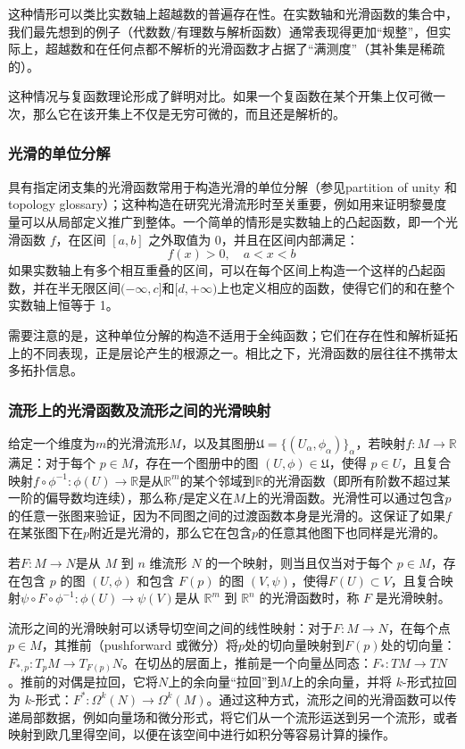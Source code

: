 这种情形可以类比实数轴上超越数的普遍存在性。在实数轴和光滑函数的集合中，我们最先想到的例子（代数数/有理数与解析函数）通常表现得更加“规整”，但实际上，超越数和在任何点都不解析的光滑函数才占据了“满测度”（其补集是稀疏的）。

这种情况与复函数理论形成了鲜明对比。如果一个复函数在某个开集上仅可微一次，那么它在该开集上不仅是无穷可微的，而且还是解析的。
\subsubsection{光滑的单位分解}
具有指定闭支集的光滑函数常用于构造光滑的单位分解（参见partition of unity 和topology glossary）；这种构造在研究光滑流形时至关重要，例如用来证明黎曼度量可以从局部定义推广到整体。一个简单的情形是实数轴上的凸起函数，即一个光滑函数 $f$，在区间 $[a,b]$ 之外取值为 0，并且在区间内部满足：
$$
f(x) > 0, \quad a < x < b~
$$
如果实数轴上有多个相互重叠的区间，可以在每个区间上构造一个这样的凸起函数，并在半无限区间$(-\infty, c]$和$[d, +\infty)$上也定义相应的函数，使得它们的和在整个实数轴上恒等于 1。

需要注意的是，这种单位分解的构造不适用于全纯函数；它们在存在性和解析延拓上的不同表现，正是层论产生的根源之一。相比之下，光滑函数的层往往不携带太多拓扑信息。
\subsubsection{流形上的光滑函数及流形之间的光滑映射}
给定一个维度为$m$的光滑流形$M$，以及其图册$\mathfrak{U} = \{(U_\alpha, \phi_\alpha)\}_\alpha$，若映射$f: M \to \mathbb{R}$满足：对于每个 $p \in M$，存在一个图册中的图 $(U, \phi) \in \mathfrak{U}$，使得 $p \in U$，且复合映射$f \circ \phi^{-1} : \phi(U) \to \mathbb{R}$是从$\mathbb{R}^m$的某个邻域到$\mathbb{R}$的光滑函数（即所有阶数不超过某一阶的偏导数均连续），那么称$f$是定义在$M$上的光滑函数。光滑性可以通过包含$p$的任意一张图来验证，因为不同图之间的过渡函数本身是光滑的。这保证了如果$f$在某张图下在$p$附近是光滑的，那么它在包含$p$的任意其他图下也同样是光滑的。

若$F: M \to N$是从 $M$ 到 $n$ 维流形 $N$ 的一个映射，则当且仅当对于每个 $p \in M$，存在包含 $p$ 的图 $(U, \phi)$ 和包含 $F(p)$ 的图 $(V, \psi)$，使得$F(U) \subset V$，且复合映射$\psi \circ F \circ \phi^{-1} : \phi(U) \to \psi(V)$是从 $\mathbb{R}^m$ 到 $\mathbb{R}^n$ 的光滑函数时，称 $F$ 是光滑映射。

流形之间的光滑映射可以诱导切空间之间的线性映射：对于$F: M \to N$，在每个点 $p \in M$，其推前（pushforward 或微分）将$p$处的切向量映射到$F(p)$处的切向量：$F_{*,p}: T_p M \to T_{F(p)} N$。在切丛的层面上，推前是一个向量丛同态：$F_*: TM \to TN$。推前的对偶是拉回，它将$N$上的余向量“拉回”到$M$上的余向量，并将 $k$-形式拉回为 $k$-形式：$F^*: \Omega^k(N) \to \Omega^k(M)$。通过这种方式，流形之间的光滑函数可以传递局部数据，例如向量场和微分形式，将它们从一个流形运送到另一个流形，或者映射到欧几里得空间，以便在该空间中进行如积分等容易计算的操作。

